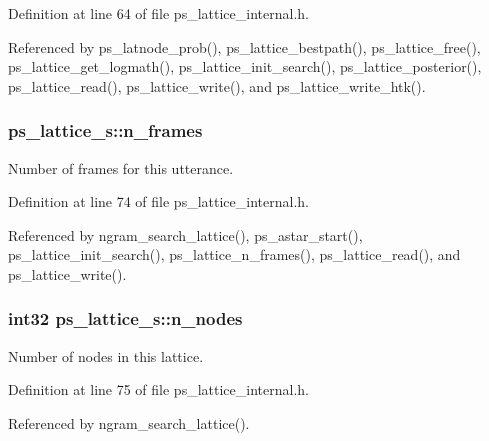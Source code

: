 Definition at line 64 of file ps\+\_\+lattice\+\_\+internal.\+h.



Referenced by ps\+\_\+latnode\+\_\+prob(), ps\+\_\+lattice\+\_\+bestpath(), ps\+\_\+lattice\+\_\+free(), ps\+\_\+lattice\+\_\+get\+\_\+logmath(), ps\+\_\+lattice\+\_\+init\+\_\+search(), ps\+\_\+lattice\+\_\+posterior(), ps\+\_\+lattice\+\_\+read(), ps\+\_\+lattice\+\_\+write(), and ps\+\_\+lattice\+\_\+write\+\_\+htk().

\subsubsection[{n\+\_\+frames}]{ ps\+\_\+lattice\+\_\+s\+::n\+\_\+frames}\label{structps__lattice__s_a3a997dc60d28b84d5bfc01f9ce25a891}


Number of frames for this utterance. 



Definition at line 74 of file ps\+\_\+lattice\+\_\+internal.\+h.



Referenced by ngram\+\_\+search\+\_\+lattice(), ps\+\_\+astar\+\_\+start(), ps\+\_\+lattice\+\_\+init\+\_\+search(), ps\+\_\+lattice\+\_\+n\+\_\+frames(), ps\+\_\+lattice\+\_\+read(), and ps\+\_\+lattice\+\_\+write().

\subsubsection[{n\+\_\+nodes}]{\setlength{\rightskip}{0pt plus 5cm}int32 ps\+\_\+lattice\+\_\+s\+::n\+\_\+nodes}\label{structps__lattice__s_adcc3bdadae1f3e3ace2d36548983ae78}


Number of nodes in this lattice. 



Definition at line 75 of file ps\+\_\+lattice\+\_\+internal.\+h.



Referenced by ngram\+\_\+search\+\_\+lattice().


